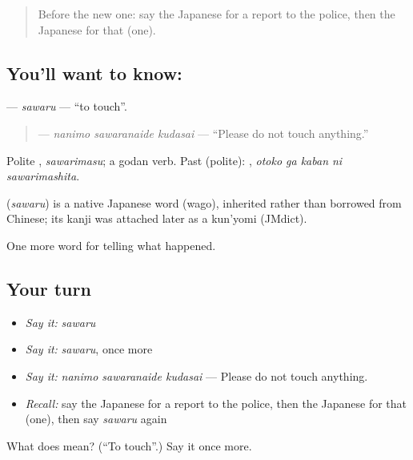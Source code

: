 \label{lesson:JA-C270-sawaru}



\begin{quote}
Before the new one: say the Japanese for a report to the police, then the Japanese for that (one).
\end{quote}

\subsection*{You'll want to know: }
\textbf{} — \emph{sawaru} — \textquotedblleft{}to touch\textquotedblright{}.

\begin{quote}
\textbf{  } — \emph{nanimo sawaranaide kudasai} — \textquotedblleft{}Please do not touch anything.\textquotedblright{}
\end{quote}

Polite \textbf{}, \emph{sawarimasu}; a godan verb. Past (polite): \textbf{  }, \emph{otoko ga kaban ni sawarimashita}.

\begin{cousinweb}
\textbf{} (\emph{sawaru}) is a native Japanese word (wago), inherited rather than borrowed from Chinese; its kanji was attached later as a kun'yomi (JMdict).
\end{cousinweb}

\begin{grammarlens}[title={What you've built}]
One more word for telling what happened.
\end{grammarlens}

\subsection*{Your turn}
\begin{itemize}
\raggedright
  \item \emph{Say it:} \emph{sawaru}
  \item \emph{Say it:} \emph{sawaru}, once more
  \item \emph{Say it:} \emph{nanimo sawaranaide kudasai} — Please do not touch anything.
  \item \emph{Recall:} say the Japanese for a report to the police, then the Japanese for that (one), then say \emph{sawaru} again
\end{itemize}

\begin{tcolorbox}[breakable,colback=teal!4,colframe=teal!35!black,title={Before you move on}]
What does  mean? (\textquotedblleft{}To touch\textquotedblright{}.) Say it once more.
\end{tcolorbox}
